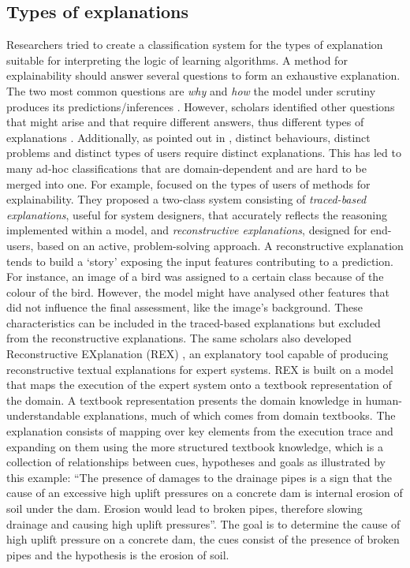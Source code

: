 \documentclass[final,1p,times]{elsarticle}
\begin{document}
\subsection{Types of explanations}\label{explanation_type}
Researchers tried to create a classification system for the types of explanation suitable for interpreting the logic of learning algorithms. A method for explainability should answer several questions to form an exhaustive explanation. The two most common questions are \textit{why} and \textit{how} the model under scrutiny produces its predictions/inferences \cite{herlocker2000explaining,krause2016interacting,preece2018asking,wang2007recommendation}. However, scholars identified other questions that might arise and that require different answers, thus different types of explanations \cite{ribera2019can}. Additionally, as pointed out in \cite{de2017people, harbers2009study}, distinct behaviours, distinct problems and distinct types of users require distinct explanations. This has led to many ad-hoc classifications that are domain-dependent and are hard to be merged into one. 
For example, \cite{wick1989reconstructive} focused on the types of users of methods for explainability. They proposed a two-class system consisting of \textit{traced-based explanations}, useful for system designers, that accurately reflects the reasoning implemented within a model, and \textit{reconstructive explanations}, designed for end-users, based on an active, problem-solving approach. A reconstructive explanation tends to build a `story' exposing the input features contributing to a prediction. For instance, an image of a bird was assigned to a certain class because of the colour of the bird. However, the model might have analysed other features that did not influence the final assessment, like the image's background. These characteristics can be included in the traced-based explanations but excluded from the reconstructive explanations. The same scholars also developed Reconstructive EXplanation (REX) \cite{wick1989reconstructive,wick1993second}, an explanatory tool capable of producing reconstructive textual explanations for expert systems. REX is built on a model that maps the execution of the expert system onto a textbook representation of the domain. A textbook representation presents the domain knowledge in human-understandable explanations, much of which comes from domain textbooks. The explanation consists of mapping over key elements from the execution trace and expanding on them using the more structured textbook knowledge, which is a collection of relationships between cues, hypotheses and goals as illustrated by this example: ``The presence of damages to the drainage pipes is a sign that the cause of an excessive high uplift pressures on a concrete dam is internal erosion of soil under the dam. Erosion would lead to broken pipes, therefore slowing drainage and causing high uplift pressures''. The goal is to determine the cause of high uplift pressure on a concrete dam, the cues consist of the presence of broken pipes and the hypothesis is the erosion of soil. 
\end{document}
